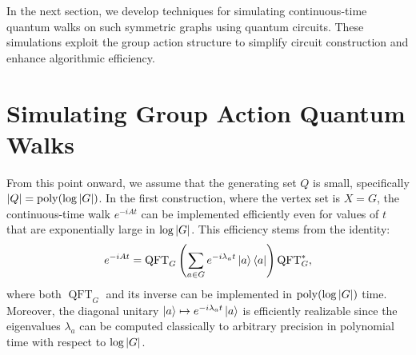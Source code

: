 \documentclass[12pt]{report}
\begin{document}



In the next section, we develop techniques for simulating continuous-time quantum walks on such symmetric graphs using quantum circuits. These simulations exploit the group action structure to simplify circuit construction and enhance algorithmic efficiency.




\chapter{Simulating Group Action Quantum Walks}


From this point onward, we assume that the generating set \( Q \) is small, specifically \( \abs{Q} = \operatorname{poly}(\log \abs{G}) \). In the first construction, where the vertex set is \( X = G \), the continuous-time walk \( e^{-iAt} \) can be implemented efficiently even for values of \( t \) that are exponentially large in \( \log \abs{G} \). This efficiency stems from the identity:
\begin{equation}
    \label{eq:adjmat-fb}
    e^{-iAt} = \operatorname{QFT}_G \left( \sum_{a \in G} e^{-i\lambda_a t} \ket{a} \bra{a} \right) \operatorname{QFT}_G^*,
\end{equation}
where both \( \operatorname{QFT}_G \) and its inverse can be implemented in \( \operatorname{poly}(\log \abs{G}) \) time. Moreover, the diagonal unitary \( \ket{a} \mapsto e^{-i\lambda_a t} \ket{a} \) is efficiently realizable since the eigenvalues \( \lambda_a \) can be computed classically to arbitrary precision in polynomial time with respect to \( \log \abs{G} \).
\end{document}
